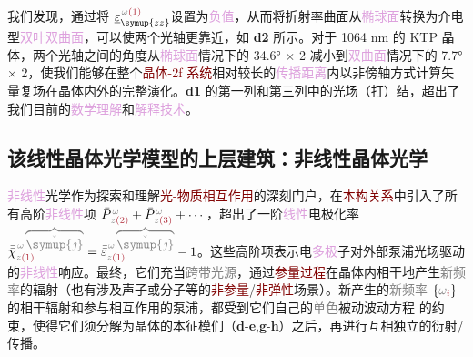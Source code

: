 我们发现，通过将 $\underline{\varepsilon}^{\;\! \mathcolor{gray}{\omega} \textcolor{Maroon}{(1)}}_{\symup{zz}}$设置为\textcolor{Plum}{负值}，从而将\textcolor{PineGreen}{折射率曲面}从\textcolor{Plum}{椭球面}转换为\textcolor{NavyBlue}{介电型}\textcolor{Plum}{双叶双曲面}，可以使两个\textcolor{PineGreen}{光轴}更靠近，如 \textbf{d2} 所示。对于 1064 nm 的 KTP 晶体，两个\textcolor{PineGreen}{光轴}之间的角度从\textcolor{Plum}{椭球面}情况下的 34.6° × 2 减小到\textcolor{Plum}{双曲面}情况下的 7.7° × 2，使我们能够在整个\textcolor{Maroon}{晶体-2f 系统}相对较长的\textcolor{Plum}{传播距离}内以\textcolor{PineGreen}{非傍轴}方式计算\textcolor{PineGreen}{矢量复场}在晶体内外的完整演化。\textbf{d1} 的第一列和第三列中的光场（打）结，超出了我们目前的\textcolor{Plum}{数学理解}和\textcolor{Plum}{解释技术}。

\vspace*{-4.5em}

\subsection{该线性晶体光学模型的上层建筑：非线性晶体光学}\label{ssec:LFCO-Superstructure}

\textcolor{Plum}{非线性}\textcolor{NavyBlue}{光学}作为探索和理解\textcolor{Maroon}{光-物质相互作用}的深刻门户，在\textcolor{Maroon}{本构关系}中引入了所有高阶\textcolor{Plum}{非线性}项 $\bar{P}^{\;\! \mathcolor{gray}{\omega}}_{\;\! \mathcolor{gray}{z} \textcolor{Maroon}{(2)}} + \bar{P}^{\;\! \mathcolor{gray}{\omega}}_{\;\! \mathcolor{gray}{z} \textcolor{Maroon}{(3)}} + \cdots$，超出了一阶\textcolor{Plum}{线性}电极化率 $\bar{\bar{\chi}}^{\;\! \mathcolor{gray}{\omega} \mathcolor{gray}{\overbrace{\check{\symup{\jmath}}}}}_{\mathcolor{gray}{z} \textcolor{Maroon}{(1)}} = \bar{\bar{\varepsilon}}^{\;\! \mathcolor{gray}{\omega} \mathcolor{gray}{\overbrace{\check{\symup{\jmath}}}}}_{\mathcolor{gray}{z} \textcolor{Maroon}{(1)}} - 1$。这些高阶项表示电\textcolor{Plum}{多极}子对外部\textcolor{NavyBlue}{泵浦光场}驱动的\textcolor{Plum}{非线性}响应。最终，它们充当\textcolor{gray}{跨带}\textcolor{gray}{光源}，通过\textcolor{Maroon}{参量过程}在晶体内\textcolor{PineGreen}{相干}地产生\textcolor{gray}{新频率}的辐射（也有涉及声子或分子等的\textcolor{Maroon}{非参量}/\textcolor{Maroon}{非弹性}场景\cite{grundmannOpticallyAnisotropicMedia2017,boydNonlinearOptics2019}）。新产生的\textcolor{gray}{新频率} $\{ \mathcolor{gray}{\omega}_{\textcolor{Maroon}{i}} \}$ 的相干辐射和参与相互作用的\textcolor{NavyBlue}{泵浦}，都受到它们自己的\textcolor{gray}{单色}\textcolor{NavyBlue}{被动}波动方程  的约束，使得它们须分解为晶体的\textcolor{PineGreen}{本征模们}（\textbf{d}-\textbf{e},\textbf{g}-\textbf{h}）之后，再进行互相独立的衍射/传播。

